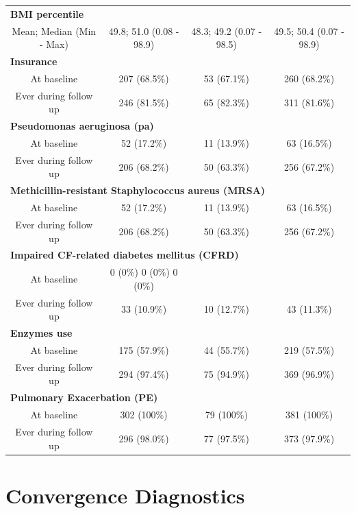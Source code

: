 \begin{center}
\begin{table}[H]
\begin{tabular}{cccc}
  \multicolumn{4}{l}{\bf BMI percentile}\\
  Mean; Median (Min - Max) & 49.8; 51.0 (0.08 - 98.9) & 48.3; 49.2 (0.07 - 98.5) & 49.5; 50.4 (0.07 - 98.9) \\
  \hline
 \multicolumn{4}{l}{\bf  Insurance}\\
  \hline
  At baseline & 207 (68.5\%) & 53 (67.1\%) & 260 (68.2\%) \\
  Ever during follow up & 246 (81.5\%) & 65 (82.3\%) & 311 (81.6\%) \\
  \hline
  \multicolumn{4}{l}{\bf Pseudomonas aeruginosa (pa)}\\
   \hline
  At baseline & 52 (17.2\%) & 11 (13.9\%) & 63 (16.5\%) \\
  Ever during follow up & 206 (68.2\%) & 50 (63.3\%) & 256 (67.2\%)\\
  \hline
\multicolumn{4}{l}{\bf Methicillin-resistant Staphylococcus aureus (MRSA)} \\
 \hline
At baseline & 52 (17.2\%) & 11 (13.9\%) & 63 (16.5\%)\\
Ever during follow up & 206 (68.2\%) & 50 (63.3\%) & 256 (67.2\%)\\
\hline
\multicolumn{4}{l}{\bf Impaired CF-related diabetes mellitus (CFRD)} \\
 \hline
At baseline & 0 (0\%) 0 (0\%) 0 (0\%) \\
Ever during follow up & 33 (10.9\%) & 10 (12.7\%) & 43 (11.3\%)\\
\hline
\multicolumn{4}{l}{\bf Enzymes use} \\
 \hline
At baseline & 175 (57.9\%) & 44 (55.7\%) & 219 (57.5\%)\\
Ever during follow up & 294 (97.4\%) & 75 (94.9\%) & 369 (96.9\%)\\
\hline
\multicolumn{4}{l}{\bf Pulmonary Exacerbation (PE)} \\
 \hline
At baseline & 302 (100\%) & 79 (100\%) & 381 (100\%) \\
Ever during follow up & 296 (98.0\%) & 77 (97.5\%) & 373 (97.9\%)\\
    \bottomrule
  \end{tabular}
\end{table}
\label{tab:appb_dem}
\end{center}

\section{Convergence Diagnostics}

